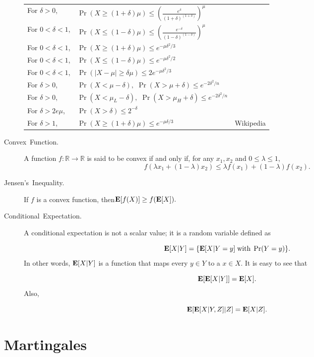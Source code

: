 \documentclass[11pt]{article}
\theoremstyle{mytheoremstyle}
\begin{document}
\begin{description}
	\begin{center}
		\begin{tabular}{lll}
			For $\delta>0$, & $\Pr(X\geq(1+\delta)\mu)\leq\left(\frac{e^{\delta}}{(1+\delta)^{(1+\delta)}}\right)^{\mu}$\bigskip{}
			& \cite[Page 64]{Michael2005}\tabularnewline
			For $0<\delta<1$, & $\Pr(X\leq(1-\delta)\mu)\leq\left(\frac{e^{-\delta}}{(1-\delta)^{(1-\delta)}}\right)^{\mu}$\bigskip{}
			& \cite[Page 66]{Michael2005}\tabularnewline
			For $0<\delta<1$, & $\Pr(X\geq(1+\delta)\mu)\leq e^{-\mu\delta^{2}/3}$\bigskip{}
			& \cite[Page 64]{Michael2005}\tabularnewline
			For $0<\delta<1$, & $\Pr(X\leq(1-\delta)\mu)\leq e^{-\mu\delta^{2}/2}$\bigskip{}
			& \cite[Page 66]{Michael2005}\tabularnewline
			For $0<\delta<1$, & $\Pr(|X-\mu|\geq\delta\mu)\leq2e^{-\mu\delta^{2}/3}$\bigskip{}
			& \cite[Page 67]{Michael2005}\tabularnewline
			For $\delta>0$, & $\Pr(X<\mu-\delta),\,\,\Pr(X>\mu+\delta)\leq e^{-2\delta^{2}/n}$\bigskip{}
			& \cite[Page 6]{dubhashi:2009}\tabularnewline
			For $\delta>0$, & $\Pr(X<\mu_{L}-\delta),\,\,\Pr(X>\mu_{H}+\delta)\leq e^{-2\delta^{2}/n}$\bigskip{}
			& \cite[Page 8]{dubhashi:2009}\tabularnewline
			For $\delta>2e\mu$, & $\Pr(X>\delta)\leq2^{-\delta}$\bigskip{}
			& \cite[Page 7]{dubhashi:2009}\tabularnewline
			For $\delta>1$, & $\Pr(X\geq(1+\delta)\mu)\leq e^{-\mu\delta/3}$ & Wikipedia\tabularnewline
		\end{tabular}
		\par\end{center}
	\item [{Convex~Function.}] A function $f:\mathbb{R\to\mathbb{R}}$ is
	said to be convex if and only if, for any $x_{1},x_{2}$ and $0\leq\lambda\leq1$,
	\[
	f(\lambda x_{1}+(1-\lambda)x_{2})\leq\lambda f(x_{1})+(1-\lambda)f(x_{2}).
	\]
	\item [{Jensen's~Inequality.}] If $f$ is a convex function, then\enspace{}$\mathrm{\mathbf{E}}[f(X)]\geq f(\mathrm{\mathbf{E}}[X]).$
	\item [{Conditional~Expectation.}] A conditional expectation is not a
	scalar value; it is a random variable defined as
	
	\[
	\mathrm{\mathbf{E}}[X|Y]=\{\mathrm{\mathbf{E}}[X|Y=y]\;\text{with}\;\Pr(Y=y)\}.
	\]
	In other words, $\mathrm{\mathbf{E}}[X|Y]$ is a function that maps every $y\in Y$
	to a $x\in X$. It is easy to see that
	
	\[
	\mathrm{\mathbf{E}}[\mathrm{\mathbf{E}}[X|Y]]=\mathrm{\mathbf{E}}[X].
	\]
	Also,
	
	\[
	\mathrm{\mathbf{E}}[\mathrm{\mathbf{E}}[X|Y,Z]|Z]=\mathrm{\mathbf{E}}[X|Z].
	\]
	
\end{description}

\section{Martingales}
\end{document}
